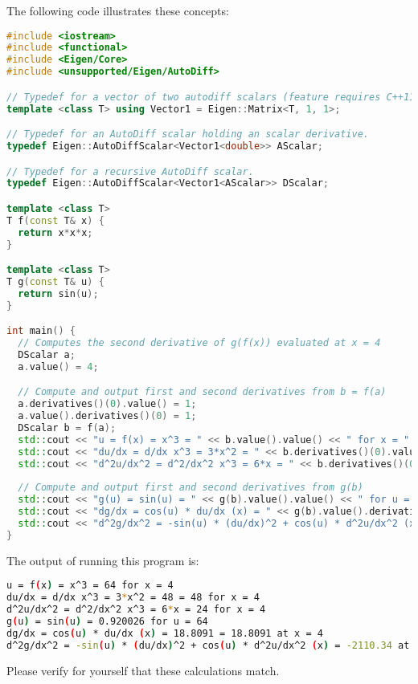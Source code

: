 \documentclass[letterpaper, 12 pt, onecolumn, journal]{IEEEtran}  %
\begin{document}
The following code illustrates these concepts:
\begin{lstlisting}[language=C++]
#include <iostream>
#include <functional>
#include <Eigen/Core>
#include <unsupported/Eigen/AutoDiff>

// Typedef for a vector of two autodiff scalars (feature requires C++11). 
template <class T> using Vector1 = Eigen::Matrix<T, 1, 1>;

// Typedef for an AutoDiff scalar holding an scalar derivative.
typedef Eigen::AutoDiffScalar<Vector1<double>> AScalar;

// Typedef for a recursive AutoDiff scalar.
typedef Eigen::AutoDiffScalar<Vector1<AScalar>> DScalar;

template <class T>
T f(const T& x) {
  return x*x*x;
}

template <class T>
T g(const T& u) {
  return sin(u);
}

int main() {
  // Computes the second derivative of g(f(x)) evaluated at x = 4
  DScalar a;
  a.value() = 4;

  // Compute and output first and second derivatives from b = f(a)
  a.derivatives()(0).value() = 1;
  a.value().derivatives()(0) = 1;
  DScalar b = f(a);
  std::cout << "u = f(x) = x^3 = " << b.value().value() << " for x = " << a.value() << std::endl;
  std::cout << "du/dx = d/dx x^3 = 3*x^2 = " << b.derivatives()(0).value() << " = " << b.value().derivatives()(0) << " for x = " << a.value() << std::endl;
  std::cout << "d^2u/dx^2 = d^2/dx^2 x^3 = 6*x = " << b.derivatives()(0).derivatives() << " for x = " << a.value() << std::endl;
  
  // Compute and output first and second derivatives from g(b)
  std::cout << "g(u) = sin(u) = " << g(b).value().value() << " for u = " << b.value().value() << std::endl;
  std::cout << "dg/dx = cos(u) * du/dx (x) = " << g(b).value().derivatives()(0) << " = " << g(b).derivatives()(0).value() << " at x = " << a.value() << std::endl;
  std::cout << "d^2g/dx^2 = -sin(u) * (du/dx)^2 + cos(u) * d^2u/dx^2 (x) = " << g(b).derivatives()(0).derivatives()(0) << " at x = " << a.value() << std::endl;
}
\end{lstlisting}
The output of running this program is:
\begin{lstlisting}[language=bash]
u = f(x) = x^3 = 64 for x = 4
du/dx = d/dx x^3 = 3*x^2 = 48 = 48 for x = 4
d^2u/dx^2 = d^2/dx^2 x^3 = 6*x = 24 for x = 4
g(u) = sin(u) = 0.920026 for u = 64
dg/dx = cos(u) * du/dx (x) = 18.8091 = 18.8091 at x = 4
d^2g/dx^2 = -sin(u) * (du/dx)^2 + cos(u) * d^2u/dx^2 (x) = -2110.34 at x = 4
\end{lstlisting}
Please verify for yourself that these calculations match.


%
\end{document}
